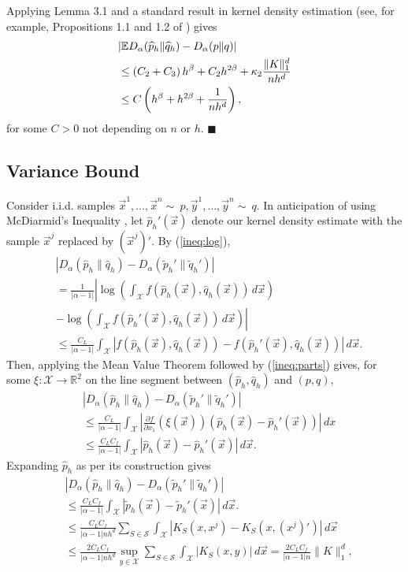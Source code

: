 \documentclass{article}
\renewcommand{\qed}{\quad \ensuremath{\blacksquare}}    %
\newcommand{\R}{\mathbb{R}}                         %
\newcommand{\Se}{\mathcal{S}}                       %
\newcommand{\X}{\mathcal{X}}                        %
\newcommand{\E}{\mathbb{E}}                         %
\newcommand{\cpest}{\widehat{p}_h}                  %
\newcommand{\cqest}{\widehat{q}_h}                  %
\newcommand{\pest}{\widetilde{p}_h}                 %
\newcommand{\qest}{\widetilde{q}_h}                 %
\newcommand{\vx}{\vec{x}}                           %
\newcommand{\vy}{\vec{y}}                           %
\begin{document}
Applying Lemma 3.1 and a standard result in kernel density estimation (see, for
example, Propositions 1.1 and 1.2 of \citet{Tsybakov:2008:INE:1522486}) gives
\begin{align}
\notag
 & |\E D_\alpha(\cpest \| \cqest) - D_\alpha(p \| q)|   \\
\label{ineq:bias_consts}
 &  \leq \left( C_2 + C_3 \right)h^\beta
    + C_2 h^{2\beta}
    + \kappa_2 \frac{\|K\|_1^d}{nh^d} \\
\notag
 & \leq C\left(h^\beta + h^{2\beta} + \frac{1}{nh^d}\right),
\end{align}
for some $C > 0$ not depending on $n$ or $h$. \qed
\subsection{Variance Bound}
Consider i.i.d. samples $\vx^1,\dots,\vx^n\sim~p, \vy^1,\dots,\vy^n\sim~q$. In
anticipation of using McDiarmid's Inequality \citep{McDiarmid1989}, let
$\cpest'(\vx)$ denote our kernel density estimate with the sample $\vx^j$
replaced by $(\vx^j)'$. By (\ref{ineq:log}),
\begin{align*}
 & |D_\alpha(\cpest\|\cqest) - D_\alpha(\pest'\|\qest')|    \\
 &  = \frac{1}{|\alpha - 1|}
        \left| \log\left(\int_\X f(\cpest(\vx), \cqest(\vx)) \, d\vx\right)
                \right. \\
 &  - \left. \log\left(\int_\X f(\cpest'(\vx),\cqest(\vx)) \, d\vx\right)
                \right| \\
 &  \leq \frac{C_L}{|\alpha - 1|} \int_\X
        \left| f(\cpest(\vx),\cqest(\vx)) - f(\cpest'(\vx),\cqest(\vx))
                \right| \, d\vx.
\end{align*}
Then, applying the Mean Value Theorem followed by (\ref{ineq:parts}) gives, for
some  $\xi : \X \to \R^2$ on the line segment between $(\cpest,\cqest)$
and $(p,q)$,
\begin{align*}
 & |D_\alpha(\cpest\|\cqest) - D_\alpha(\pest'\|\qest')|    \\
 &  \leq \frac{C_L}{|\alpha - 1|}
    \int_\X \left| \frac{\partial f}{\partial x_1} (\xi(\vx))
            (\cpest(\vx) - \cpest'(\vx)) \right| \, dx  \\
 &  \leq \frac{C_LC_f}{|\alpha - 1|}
    \int_\X \left| \cpest(\vx) - \cpest'(\vx) \right| \, d\vx.
\end{align*}
Expanding $\cpest$ as per its construction gives
\begin{align*}
 & |D_\alpha(\cpest\|\cqest) - D_\alpha(\pest'\|\qest')|            \\
 &  \leq \frac{C_LC_f}{|\alpha - 1|}
    \int_\X \left| \pest(\vx) - \pest'(\vx) \right| \, d\vx.        \\
 &  \leq \frac{C_LC_f}{|\alpha - 1|nh^d} \sum_{S \in \Se}
    \int_\X \left|K_S(x,x^j) - K_S(x,(x^j)') \right| \, d\vx  \\
 &  \leq \frac{2C_LC_f}{|\alpha - 1|nh^d} \sup_{y \in \X} \sum_{S \in \Se}
    \int_\X \left|K_S(x,y) \right| \, d\vx
    = \frac{2C_LC_f}{|\alpha - 1|n} \|K\|_1^d,
\end{align*}
\end{document}

